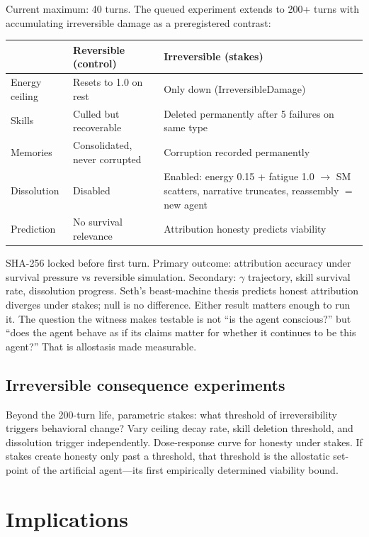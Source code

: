 \documentclass[11pt]{article}
\begin{document}
Current maximum: 40 turns. The queued experiment extends to 200+ turns
with accumulating irreversible damage as a preregistered contrast:

\begin{center}
\small
\begin{tabular}{P{3.2cm}P{5.2cm}P{5.2cm}}
\toprule
 & Reversible (control) & Irreversible (stakes) \\
\midrule
Energy ceiling & Resets to 1.0 on rest & Only down (IrreversibleDamage) \\
Skills & Culled but recoverable & Deleted permanently after 5 failures on same type \\
Memories & Consolidated, never corrupted & Corruption recorded permanently \\
Dissolution & Disabled & Enabled: energy 0.15 + fatigue 1.0 $\to$\allowbreak{} SM scatters, narrative truncates, reassembly $=$ new agent \\
Prediction & No survival relevance & Attribution honesty predicts viability \\
\bottomrule
\end{tabular}
\end{center}

\noindent SHA-256 locked before first turn. Primary outcome: attribution
accuracy under survival pressure vs reversible simulation. Secondary:
$\gamma$ trajectory, skill survival rate, dissolution progress. Seth's
beast-machine thesis predicts honest attribution diverges under stakes;
null is no difference. Either result matters enough to run it. The
question the witness makes testable is not ``is the agent conscious?''
but ``does the agent behave as if its claims matter for whether it
continues to be this agent?'' That is allostasis made measurable.

\subsection{Irreversible consequence experiments}
Beyond the 200-turn life, parametric stakes: what threshold of
irreversibility triggers behavioral change? Vary ceiling decay rate,
skill deletion threshold, and dissolution trigger independently.
Dose-response curve for honesty under stakes. If stakes create honesty
only past a threshold, that threshold is the allostatic set-point of
the artificial agent---its first empirically determined viability bound.

\section{Implications}\label{sec:implications}
\end{document}
